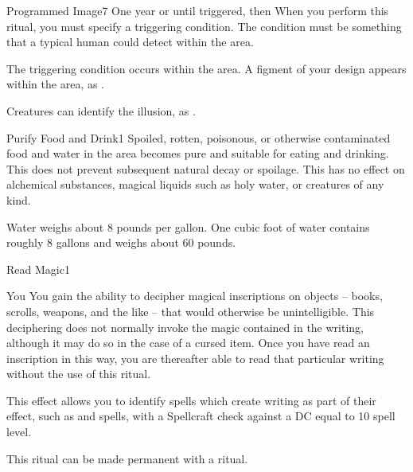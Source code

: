 \begin{spellsection}{Programmed Image}{7}
\spelldur One year or until triggered, then \durmed
\spellspecial When you perform this ritual, you must specify a triggering condition. The condition must be something that a typical human could detect within the area.
\begin{spelltrigger}{The triggering condition occurs within the area}.
    \spelleffect A figment of your design appears within the area, as .
\end{spelltrigger}
\spellnotes Creatures can identify the illusion, as .
\end{spellsection}

\begin{spellsection}{Purify Food and Drink}{1}
\spellline
\spelleffect Spoiled, rotten, poisonous, or otherwise contaminated food and water in the area becomes pure and suitable for eating and drinking. This does not prevent subsequent natural decay or spoilage.
\spellnotes This has no effect on alchemical substances, magical liquids such as holy water, or creatures of any kind.

Water weighs about 8 pounds per gallon. One cubic foot of water contains roughly 8 gallons and weighs about 60 pounds.
\end{spellsection}

\begin{spellsection}{Read Magic}{1}
\spelldur \durlong
\begin{spelltarget}{You}
    \spelleffect You gain the ability to decipher magical inscriptions on objects -- books, scrolls, weapons, and the like -- that would otherwise be unintelligible. This deciphering does not normally invoke the magic contained in the writing, although it may do so in the case of a cursed item. Once you have read an inscription in this way, you are thereafter able to read that particular writing without the use of this ritual.

    This effect allows you to identify spells which create writing as part of their effect, such as  and  spells, with a Spellcraft check against a DC equal to 10 \add spell level.
\end{spelltarget}
\spellnotes This ritual can be made permanent with a  ritual.
\end{spellsection}

